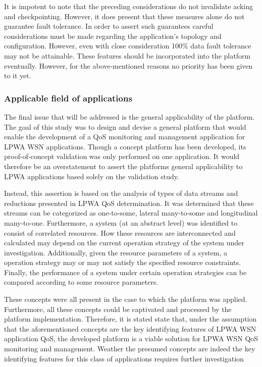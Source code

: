 It is impotent to note that the preceding considerations do not invalidate acking and checkpointing. However, it does present that these measures alone do not guarantee fault tolerance. In order to assert such guarantees careful considerations must be made regarding the application's topology and configuration. However, even with close consideration 100\% data fault tolerance may not be attainable. These features should be incorporated into the platform eventually. However, for the above-mentioned reasons no priority has been given to it yet.

\subsubsection{Applicable field of applications}
The final issue that will be addressed is the general applicability of the platform. The goal of this study was to design and devise a general platform that would enable the development of a QoS monitoring and management application for LPWA WSN applications. Though a concept platform has been developed, its proof-of-concept validation was only performed on one application. It would therefore be an overstatement to assert the platforms general applicability to LPWA applications based solely on the validation study.

Instead, this assertion is based on the analysis of types of data streams and reductions presented in LPWA QoS determination. It was determined that these streams can be categorized as one-to-some, lateral many-to-some and longitudinal many-to-one. Furthermore, a system (at an abstract level) was identified to consist of correlated resources. How these resources are interconnected and calculated may depend on the current operation strategy of the system under investigation. Additionally, given the resource parameters of a system, a operation strategy may or may not satisfy the specified resource constraints. Finally, the performance of a system under certain operation strategies can be compared according to some resource parameters.

These concepts were all present in the case to which the platform was applied. Furthermore, all these concepts could be captivated and processed by the platform implementation. Therefore, it is stated state that, under the assumption that the aforementioned concepts are the key identifying features of LPWA WSN application QoS, the developed platform is a viable solution for LPWA WSN QoS monitoring and management. Weather the presumed concepts are indeed the key identifying features for this class of applications requires further investigation

